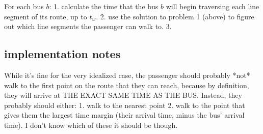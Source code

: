 \documentclass[11pt]{article} %
\begin{document}
For each bus $b$:
	1. calculate the time that the bus $b$ will begin traversing each line segment of its route, up to $t_w$.
	2. use the solution to problem 1 (above) to figure out which line segments the passenger can walk to.
	3. 


\subsection*{implementation notes}
While it's fine for the very idealized case, the passenger should probably *not* walk to the first point on the route that they can reach, because by definition, they will arrive at THE EXACT SAME TIME AS THE BUS. Instead, they probably should either:
1. walk to the nearest point
2. walk to the point that gives them the largest time margin (their arrival time, minus the bus' arrival time).
I don't know which of these it should be though.
\end{document}
